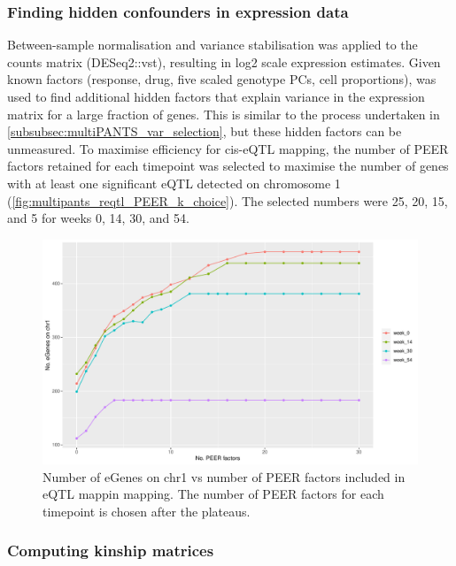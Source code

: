 \subsubsection{Finding hidden confounders in expression data}

Between-sample normalisation and variance stabilisation was applied to the counts matrix (DESeq2::vst), resulting in log2 scale expression estimates.
Given known factors (response, drug, five scaled genotype \glspl{PC}, cell proportions), 
 was used to find additional hidden factors that explain variance in the expression matrix for a large fraction of genes.
This is similar to the process undertaken in \autoref{subsubsec:multiPANTS_var_selection}, but these hidden factors can be unmeasured.
To maximise efficiency for cis-\gls{eQTL} mapping, 
the number of PEER factors retained for each timepoint was selected to maximise the number of genes with at least one significant \gls{eQTL} detected on chromosome 1 (\autoref{fig:multipants_reqtl_PEER_k_choice}).
The selected numbers were 25, 20, 15, and 5 for weeks 0, 14, 30, and 54.

\begin{figure}
    \centering
    \includegraphics[width=1.0\textwidth,page=1]{mainmatter/figures/chapter_04/count_eGenes.signif_eGenes_vs_PEER_n.dataset_multiPANTS.chr_1.pdf}
    \caption{Number of eGenes on chr1 vs number of PEER factors included in \gls{eQTL} mappin mapping. The number of PEER factors for each timepoint is chosen after the plateaus.}
    \label{fig:multipants_reqtl_PEER_k_choice}
\end{figure}

\subsubsection{Computing kinship matrices}

